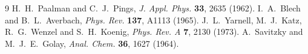 \documentclass[11pt,a4paper]{report}
\begin{document}
\begin{thebibliography}{9}
 H.~H.~Paalman and C.~J.~Pings, \emph{J. Appl. Phys.} \textbf{33}, 2635 (1962).
 I.~A.~Blech and B.~L.~Averbach, \emph{Phys. Rev.} \textbf{137}, A1113 (1965).
 J.~L.~Yarnell, M.~J.~Katz, R.~G.~Wenzel and S.~H.~Koenig, \emph{Phys. Rev. A} \textbf{7}, 2130 (1973).
 A.~Savitzky and M.~J.~E.~Golay, \emph{Anal. Chem.} \textbf{36}, 1627 (1964).
\end{thebibliography}
\end{document}
